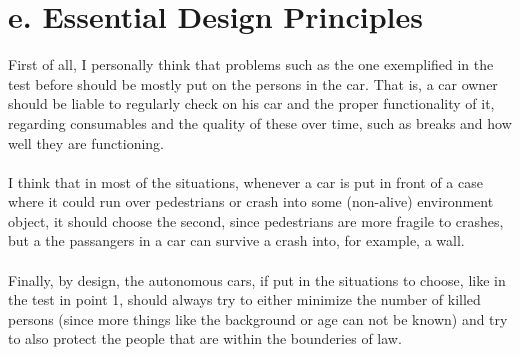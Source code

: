 \documentclass[english]{report}
\begin{document}
\section*{e. Essential Design Principles}

First of all, I personally think that problems such as the one exemplified in the test before should be mostly put on the persons in the car. That is, a car owner should be liable to regularly check on his car and the proper functionality of it, regarding consumables and the quality of these over time, such as breaks and how well they are functioning. \\\\

\noindent
I think that in most of the situations, whenever a car is put in front of a case where it could run over pedestrians or crash into some (non-alive) environment object, it should choose the second, since pedestrians are more fragile to crashes, but a the passangers in a car can survive a crash into, for example, a wall. \\\\

\noindent
Finally, by design, the autonomous cars, if put in the situations to choose, like in the test in point 1, should always try to either minimize the number of killed persons (since more things like the background or age can not be known) and try to also protect the people that are within the bounderies of law.
\end{document}
